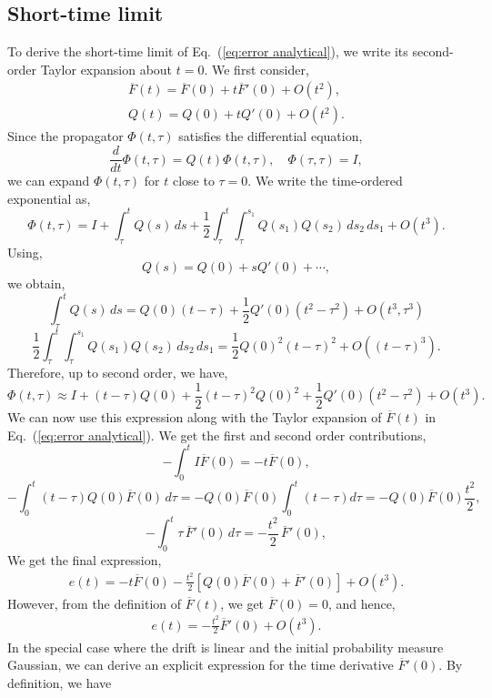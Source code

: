 \documentclass[11pt, a4paper, oneside, reqno]{amsart}
\begin{document}
\subsection{Short-time limit}
\noindent To derive the short-time limit of Eq.~(\ref{eq:error analytical}), we write its second-order Taylor expansion about $t=0$. We first consider, 
\begin{eqnarray}
    \overline{F}(t) = \overline{F}(0) + t\overline{F}'(0) + O(t^2),\\
    Q(t) = Q(0) + tQ'(0) + O(t^2).
\end{eqnarray}
Since the propagator \(\Phi(t, \tau)\) satisfies the differential equation,
\[
\frac{d}{dt} \Phi(t, \tau) = Q(t) \Phi(t, \tau), \quad \Phi(\tau, \tau) = I,
\]
we can expand \(\Phi(t, \tau)\) for \(t\) close to \(\tau = 0\). We write the time-ordered exponential as,
\[
\Phi(t, \tau) = I + \int_{\tau}^{t} Q(s) \, ds + \frac{1}{2} \int_{\tau}^{t} \int_{\tau}^{s_1} Q(s_1) Q(s_2) \, ds_2 \, ds_1 + O(t^3).
\]
Using,
\[
Q(s) = Q(0) + s Q'(0) + \cdots,
\]
we obtain,
\[
\int_{\tau}^{t} Q(s) \, ds = Q(0)(t - \tau) + \frac{1}{2} Q'(0)(t^2 - \tau^2) + O(t^3, \tau^3)
\]
\[
\frac{1}{2} \int_{\tau}^{t} \int_{\tau}^{s_1} Q(s_1) Q(s_2) \, ds_2 \, ds_1 = \frac{1}{2} Q(0)^2(t - \tau)^2 + O((t-\tau)^3).
\]
Therefore, up to second order, we have,
\[
\Phi(t, \tau) \approx I + (t - \tau) Q(0) + \frac{1}{2} (t - \tau)^2 Q(0)^2 + \frac{1}{2}Q'(0)(t^2-\tau^2) + O(t^3).
\]
We can now use this expression along with the Taylor expansion of $\overline{F}(t)$ in Eq.~(\ref{eq:error analytical}). We get the first and second order contributions,
\[
-\int_0^t I \overline{F}(0) = -t\overline{F}(0),
\]
\[
-\int_0^t (t - \tau) Q(0) \overline{F}(0) \, d\tau = -Q(0) \overline{F}(0) \int_0^t (t - \tau) d\tau = -Q(0) \overline{F}(0) \frac{t^2}{2},
\]
\[
-\int_0^t \tau \, \overline{F}'(0) \, d\tau = -\frac{t^2}{2} \, \overline{F}'(0),
\]
We get the final expression,
\begin{eqnarray}
    e(t) = -t\overline{F}(0) - \frac{t^2}{2}[Q(0)\overline{F}(0)+\overline{F}'(0)] + O(t^3).
\end{eqnarray}
However, from the definition of $\overline{F}(t)$, we get $\overline{F}(0)=0$, and hence,
\begin{eqnarray}
    e(t) =  -\frac{t^2}{2}\overline{F}'(0) + O(t^3).
\end{eqnarray}
In the special case where the drift is linear and the initial probability measure Gaussian, we can derive an explicit expression for the time derivative $\overline{F}'(0)$. By definition, we have
\end{document}
